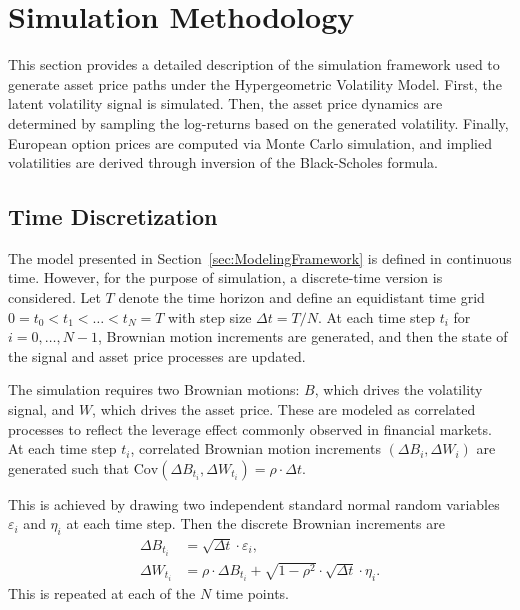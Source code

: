 \section{Simulation Methodology} \label{sec:SimulationMethodology}

This section provides a detailed description of the simulation framework used to generate asset price paths under the Hypergeometric Volatility Model. First, the latent volatility signal is simulated. Then, the asset price dynamics are determined by sampling the log-returns based on the generated volatility. Finally, European option prices are computed via Monte Carlo simulation, and implied volatilities are derived through inversion of the Black-Scholes formula.


\subsection{Time Discretization} \label{subsec:TimeDiscretization}

The model presented in Section~\ref{sec:ModelingFramework} is defined in continuous time. However, for the purpose of simulation, a discrete-time version is considered. Let $T$ denote the time horizon and define an equidistant time grid $0 = t_0 < t_1 < \ldots < t_N = T$ with step size $\Delta t = T/N$. At each time step $t_i$ for $i = 0,\ldots,N-1$, Brownian motion increments are generated, and then the state of the signal and asset price processes are updated.

The simulation requires two Brownian motions: $B$, which drives the volatility signal, and $W$, which drives the asset price. These are modeled as correlated processes to reflect the leverage effect commonly observed in financial markets. At each time step $t_i$, correlated Brownian motion increments $(\Delta B_i, \Delta W_i)$ are generated such that $\mathrm{Cov}(\Delta B_{t_i}, \Delta W_{t_i}) = \rho \cdot \Delta t$.

This is achieved by drawing two independent standard normal random variables $\varepsilon_i$ and $\eta_i$ at each time step. Then the discrete Brownian increments are
\begin{align} \label{eq:BrownianMotions}
    \Delta B_{t_i} &= \sqrt{\Delta t} \cdot \varepsilon_i, \\
    \Delta W_{t_i} &= \rho \cdot \Delta B_{t_i} + \sqrt{1 - \rho^2} \cdot \sqrt{\Delta t} \cdot \eta_i.
\end{align}
This is repeated at each of the $N$ time points.


